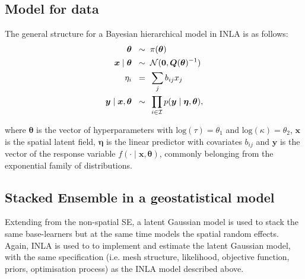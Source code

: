 \documentclass{article}
\begin{document}
\subsection{Model for data}

The general structure for a Bayesian hierarchical model in INLA is as follows:
\begin{align}
\boldsymbol{\theta} \hspace{2mm} \sim & \hspace{2mm} \pi(\boldsymbol{\theta}) \label{eqn:eq5}\\
\boldsymbol{x} \mid \boldsymbol{\theta} \hspace{2mm} \sim & \hspace{2mm} \mathcal{N}(\boldsymbol{0}, \boldsymbol{Q}(\boldsymbol{\theta})^{-1}) \label{eqn:eq6}\\
\eta_{i} \hspace{2mm} = & \hspace{2mm} \sum_{j}b_{ij}x_{j}\label{eqn:eq7}\\
\boldsymbol{y} \mid \boldsymbol{x}, \boldsymbol{\theta} \hspace{2mm} \sim & \hspace{2mm} \prod_{i \in \mathcal{I}}p(\boldsymbol{y} \mid \boldsymbol{\eta}, \boldsymbol{\theta}) \label{eqn:eq8},
\end{align}

where $\boldsymbol{\theta}$ is the vector of hyperparameters with $\text{log}(\tau) = \theta_{1}$ and $\text{log}(\kappa) = \theta_{2}$,  $\boldsymbol{x}$ is the spatial latent field, $\boldsymbol{\eta}$ is the linear predictor with covariates $b_{ij}$ and $\boldsymbol{y}$ is the vector of the response variable $f(\cdot \mid \boldsymbol{x}, \boldsymbol{\theta})$, commonly belonging from the exponential family of distributions. 
\vspace{0.2cm}

 
\subsection{Stacked Ensemble in a geostatistical model}
Extending from the non-spatial SE, a latent Gaussian model is used to stack the same base-learners but at the same time models the spatial random effects. Again, INLA is used to to implement and estimate the latent Gaussian model, with the same specification (i.e. mesh structure, likelihood, objective function, priors, optimisation process) as the INLA model described above. 
\end{document}
